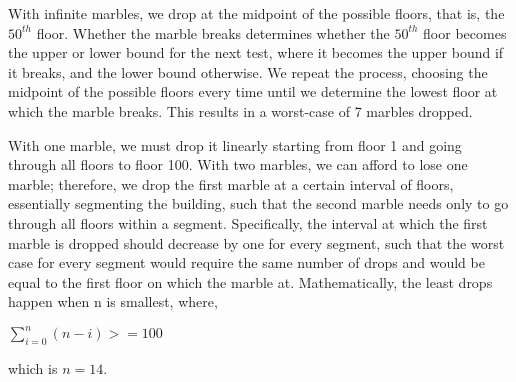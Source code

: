 \documentclass{article}
\begin{document}
\begin{enumerate}
    With infinite marbles, we drop at the midpoint of the possible floors, that is, the $50^{th}$ floor. Whether the marble breaks determines whether the $50^{th}$ floor becomes the upper or lower bound for the next test, where it becomes the upper bound if it breaks, and the lower bound otherwise. We repeat the process, choosing the midpoint of the possible floors every time until we determine the lowest floor at which the marble breaks. This results in a worst-case of 7 marbles dropped.

    With one marble, we must drop it linearly starting from floor 1 and going through all floors to floor 100. With two marbles, we can afford to lose one marble; therefore, we drop the first marble at a certain interval of floors, essentially segmenting the building, such that the second marble needs only to go through all floors within a segment. Specifically, the interval at which the first marble is dropped should decrease by one for every segment, such that the worst case for every segment would require the same number of drops and would be equal to the first floor on which the marble at. Mathematically, the least drops happen when n is smallest, where,
    
    \(\sum^n_{i=0}(n-i) >= 100\)

    which is $ n = 14$.
    
\end{enumerate}
\end{document}
